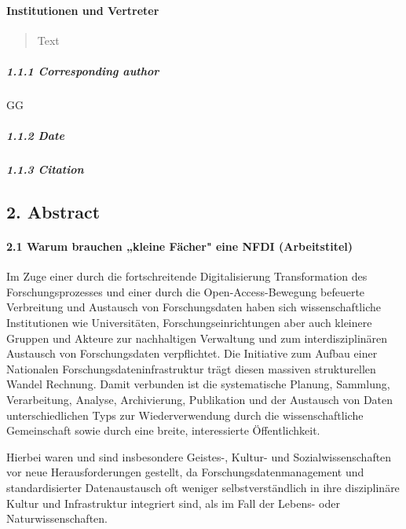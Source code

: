 \hypertarget{institutionen-und-vertreter}{%
\paragraph{Institutionen und
Vertreter}\label{institutionen-und-vertreter}}

\begin{quote}
Text
\end{quote}

\hypertarget{corresponding-author}{%
\subparagraph{1.1.1 Corresponding author}\label{corresponding-author}}

GG

\hypertarget{date}{%
\subparagraph{1.1.2 Date}\label{date}}

\hypertarget{citation}{%
\subparagraph{1.1.3 Citation}\label{citation}}

\hypertarget{abstract}{%
\subsection{2. Abstract}\label{abstract}}

\hypertarget{warum-brauchen-kleine-fuxe4cher-eine-nfdi-arbeitstitel}{%
\paragraph{2.1 Warum brauchen „kleine Fächer" eine NFDI
(Arbeitstitel)}\label{warum-brauchen-kleine-fuxe4cher-eine-nfdi-arbeitstitel}}

Im Zuge einer durch die fortschreitende Digitalisierung Transformation
des Forschungsprozesses und einer durch die Open-Access-Bewegung
befeuerte Verbreitung und Austausch von Forschungsdaten haben sich
wissenschaftliche Institutionen wie Universitäten,
Forschungseinrichtungen aber auch kleinere Gruppen und Akteure zur
nachhaltigen Verwaltung und zum interdisziplinären Austausch von
Forschungsdaten verpflichtet. Die Initiative zum Aufbau einer Nationalen
Forschungsdateninfrastruktur trägt diesen massiven strukturellen Wandel
Rechnung. Damit verbunden ist die systematische Planung, Sammlung,
Verarbeitung, Analyse, Archivierung, Publikation und der Austausch von
Daten unterschiedlichen Typs zur Wiederverwendung durch die
wissenschaftliche Gemeinschaft sowie durch eine breite, interessierte
Öffentlichkeit.

Hierbei waren und sind insbesondere Geistes-, Kultur- und
Sozialwissenschaften vor neue Herausforderungen gestellt, da
Forschungsdatenmanagement und standardisierter Datenaustausch oft
weniger selbstverständlich in ihre disziplinäre Kultur und Infrastruktur
integriert sind, als im Fall der Lebens- oder Naturwissenschaften.

